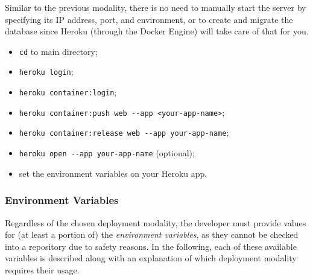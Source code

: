 \documentclass[a4paper, english]{article}
\newcounter{subsubsubsection}[subsubsection]
\begin{document}
Similar to the previous modality, there is no need to manually start the server by specifying its IP address, port, and environment, or to create and migrate the database since Heroku (through the Docker Engine) will take care of that for you.


\begin{itemize}
\item \verb|cd| to main directory;
\item \verb|heroku login|;
\item \verb|heroku container:login|;
\item \verb|heroku container:push web --app <your-app-name>|;
\item \verb|heroku container:release web --app your-app-name|;
\item \verb|heroku open --app your-app-name| (optional);
\item set the environment variables on your Heroku app.
\end{itemize}

\subsubsection{Environment Variables}

\label{env-vars}

Regardless of the chosen deployment modality, the developer must provide values for (at least a portion of) the \emph{environment variables}, as they cannot be checked into a repository due to safety reasons. In the following, each of these available variables is described 
along with an explanation of which deployment modality requires their usage.
\end{document}
